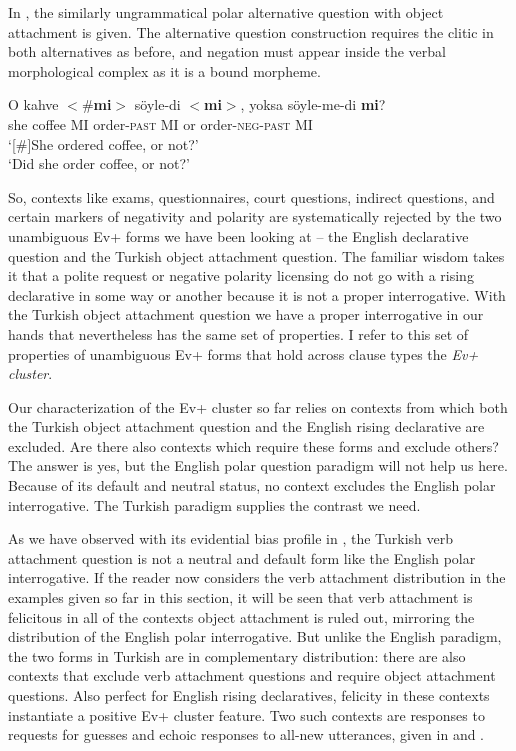 \documentclass[output=paper,colorlinks,citecolor=brown]{langscibook}
\begin{document}
In , the similarly ungrammatical polar alternative question with object attachment is given. The alternative question construction requires the clitic in both alternatives as before, and negation must appear inside the verbal morphological complex as it is a bound morpheme.

\ea\label{alt}
\gll O kahve $<$\#\textbf{mi}$>$ s\"oyle-di $<$\textbf{mi}$>$, yoksa s\"oyle-me-di \textbf{mi}?\\
she coffee \phantom{sis}MI order-\textsc{past} \phantom{ss}MI or order-\textsc{neg-past} MI \\
\glt `[\#]She ordered coffee, or not?’\\
`Did she order coffee, or not?’
\z

So, contexts like exams, questionnaires, court questions, indirect questions, and certain markers of negativity and polarity are systematically rejected by the two unambiguous Ev+ forms we have been looking at -- the English declarative question and the Turkish object attachment question. The familiar wisdom takes it that a polite request or negative polarity licensing do not go with a rising declarative in some way or another because it is not a proper interrogative. With the Turkish object attachment question we have a proper interrogative in our hands that nevertheless has the same set of properties. I refer to this set of properties of unambiguous Ev+ forms that hold across clause types  the \textit{Ev+ cluster}. 

Our characterization of the Ev+ cluster so far relies on contexts from which both the Turkish object attachment question and the English rising declarative are excluded. Are there also contexts which require these forms and exclude others? The answer is yes, but the English polar question paradigm will not help us here. Because of its default and neutral status, no context excludes the English polar interrogative. The Turkish paradigm supplies the contrast we need. 

As we have observed with its evidential bias profile in , the Turkish verb attachment question is not a neutral and default form like the English polar interrogative. If the reader now considers the verb attachment distribution in the examples given so far in this section, it will be seen that verb attachment is felicitous in all of the contexts object attachment is ruled out, mirroring the distribution of the English polar interrogative. But unlike the English paradigm, the two forms in Turkish are in complementary distribution: there are also contexts that exclude verb attachment questions and require object attachment questions. Also perfect for English rising declaratives, felicity in these contexts instantiate a positive Ev+ cluster feature. Two such contexts are responses to requests for guesses and echoic responses to all-new utterances, given in  and . 
\end{document}
